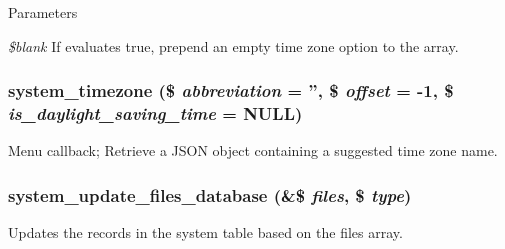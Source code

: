 \begin{DoxyParams}{Parameters}
\item[{\em \$blank}]If evaluates true, prepend an empty time zone option to the array. \end{DoxyParams}
\hypertarget{system_8module_a65d003b673cc2c7fbe24dd0cad2ee15d}{
\subsubsection[{system\_\-timezone}]{\setlength{\rightskip}{0pt plus 5cm}system\_\-timezone (\$ {\em abbreviation} = {\ttfamily ''}, \/  \$ {\em offset} = {\ttfamily -\/1}, \/  \$ {\em is\_\-daylight\_\-saving\_\-time} = {\ttfamily NULL})}}
\label{system_8module_a65d003b673cc2c7fbe24dd0cad2ee15d}
Menu callback; Retrieve a JSON object containing a suggested time zone name. \hypertarget{system_8module_aceaee6704abc9e249d9ef79918884b7a}{
\subsubsection[{system\_\-update\_\-files\_\-database}]{\setlength{\rightskip}{0pt plus 5cm}system\_\-update\_\-files\_\-database (\&\$ {\em files}, \/  \$ {\em type})}}
\label{system_8module_aceaee6704abc9e249d9ef79918884b7a}
Updates the records in the system table based on the files array.



